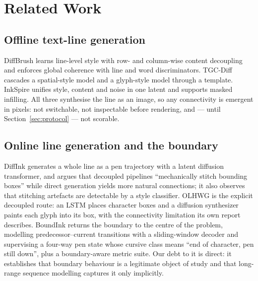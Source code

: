 \documentclass[conference]{IEEEtran}
\begin{document}
\section{Related Work}

\subsection{Offline text-line generation}
DiffBrush \cite{diffbrush} learns line-level style with row- and column-wise content
decoupling and enforces global coherence with line and word discriminators. TGC-Diff
\cite{tgc_diff} cascades a spatial-style model and a glyph-style model through a template.
InkSpire \cite{inkspire} unifies style, content and noise in one latent and supports masked
infilling. All three synthesise the line as an image, so any connectivity is emergent in
pixels: not switchable, not inspectable before rendering, and --- until Section~\ref{sec:protocol}
--- not scorable.

\subsection{Online line generation and the boundary}
DiffInk \cite{diffink} generates a whole line as a pen trajectory with a latent diffusion
transformer, and argues that decoupled pipelines ``mechanically stitch bounding boxes'' while
direct generation yields more natural connections; it also observes that stitching artefacts
are detectable by a style classifier. OLHWG \cite{layout_glyph} is the explicit decoupled
route: an LSTM places character boxes and a diffusion synthesizer paints each glyph into its
box, with the connectivity limitation its own report describes. BoundInk \cite{boundink}
returns the boundary to the centre of the problem, modelling predecessor--current transitions
with a sliding-window decoder and supervising a four-way pen state whose cursive class means
``end of character, pen still down'', plus a boundary-aware metric suite. Our debt to it is
direct: it establishes that boundary behaviour is a legitimate object of study and that
long-range sequence modelling captures it only implicitly.
\end{document}
